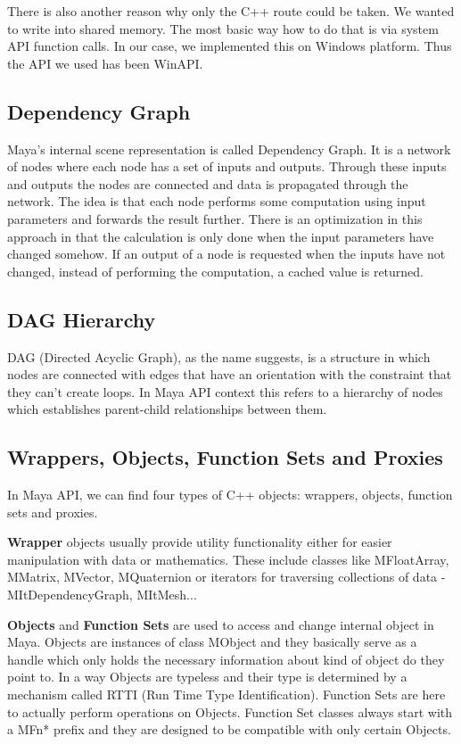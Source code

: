 \documentclass[
  digital, %
  table,   %
  nolof,     %
  nolot,     %
]{fithesis3}
\begin{document}
There is also another reason why only the C++ route could be taken. We wanted to write into shared memory. The most basic way how to do that is via system API function calls. In our case, we implemented this on Windows platform. Thus the API we used has been WinAPI.

\subsection{Dependency Graph}
Maya's internal scene representation is called Dependency Graph. It is a network of nodes where each node has a set of inputs and outputs. Through these inputs and outputs the nodes are connected and data is propagated through the network. The idea is that each node performs some computation using input parameters and forwards the result further. There is an optimization in this approach in that the calculation is only done when the input parameters have changed somehow. If an output of a node is requested when the inputs have not changed, instead of performing the computation, a cached value is returned.

\subsection{DAG Hierarchy}
DAG (Directed Acyclic Graph), as the name suggests, is a structure in which nodes are connected with edges that have an orientation with the constraint that they can't create loops. In Maya API context this refers to a hierarchy of nodes which establishes parent-child relationships between them.

\subsection{Wrappers, Objects, Function Sets and Proxies}
In Maya API, we can find four types of C++ objects: wrappers, objects, function sets and proxies.

\textbf{Wrapper} objects usually provide utility functionality either for easier manipulation with data or mathematics. These include classes like MFloatArray, MMatrix, MVector, MQuaternion or iterators for traversing collections of data - MItDependencyGraph, MItMesh...

\textbf{Objects} and \textbf{Function Sets} are used to access and change internal object in Maya. Objects are instances of class MObject and they basically serve as a handle which only holds the necessary information about kind of object do they point to. In a way Objects are typeless and their type is determined by a mechanism called RTTI (Run Time Type Identification). Function Sets are here to actually perform operations on Objects. Function Set classes always start with a MFn* prefix and they are designed to be compatible with only certain Objects.
\end{document}
